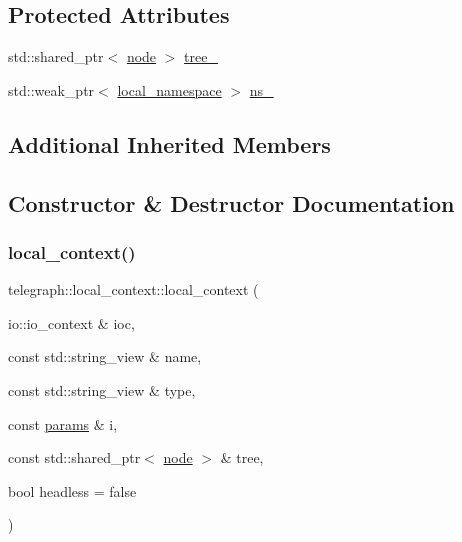 \subsection*{Protected Attributes}
\begin{DoxyCompactItemize}
\item 
std\+::shared\+\_\+ptr$<$ \hyperlink{classtelegraph_1_1node}{node} $>$ \hyperlink{classtelegraph_1_1local__context_a16ab8680bd633b8b8554960bb8c48498}{tree\+\_\+}
\item 
std\+::weak\+\_\+ptr$<$ \hyperlink{classtelegraph_1_1local__namespace}{local\+\_\+namespace} $>$ \hyperlink{classtelegraph_1_1local__context_a4ad057dd5bede6236b3af44a18577831}{ns\+\_\+}
\end{DoxyCompactItemize}
\subsection*{Additional Inherited Members}


\subsection{Constructor \& Destructor Documentation}
\mbox{\label{classtelegraph_1_1local__context_a2f6fe87993dd07754131c5248c98c11d}} 
\subsubsection{\texorpdfstring{local\+\_\+context()}{local\_context()}}
{\footnotesize\ttfamily telegraph\+::local\+\_\+context\+::local\+\_\+context (\begin{DoxyParamCaption}\item[{io\+::io\+\_\+context \&}]{ioc,  }\item[{const std\+::string\+\_\+view \&}]{name,  }\item[{const std\+::string\+\_\+view \&}]{type,  }\item[{const \hyperlink{classtelegraph_1_1params}{params} \&}]{i,  }\item[{const std\+::shared\+\_\+ptr$<$ \hyperlink{classtelegraph_1_1node}{node} $>$ \&}]{tree,  }\item[{bool}]{headless = {\ttfamily false} }\end{DoxyParamCaption})}



